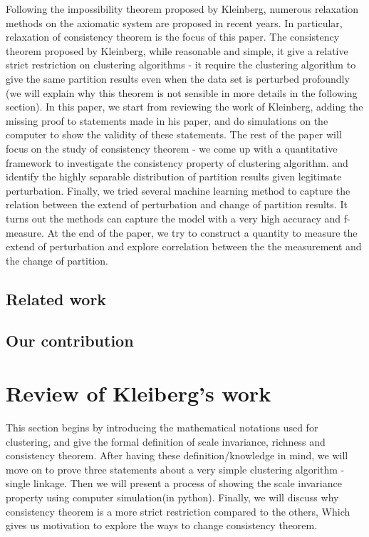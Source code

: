 \documentclass{uonmathreport}
\begin{document}
Following the impossibility theorem proposed by Kleinberg, numerous relaxation methods on the axiomatic system are proposed in recent years. In particular, relaxation of consistency theorem is the focus of this paper. The consistency theorem proposed by Kleinberg, while reasonable and simple, it give a relative strict restriction on clustering algorithms - it require the clustering algorithm to give the same partition results even when the data set is perturbed profoundly (we will explain why this theorem is not sensible in more details in the following section). In this paper, we start from reviewing the work of Kleinberg, adding the missing proof to statements made in his paper, and do simulations on the computer to show the validity of these statements. The rest of the paper will focus on the study of consistency theorem - we come up with a quantitative framework to investigate the consistency property of clustering algorithm. and identify the highly separable distribution of partition results given legitimate perturbation. Finally, we tried several machine learning method to capture the relation between the extend of perturbation and change of partition results. It turns out the methods can capture the model with a very high accuracy and f-measure. At the end of the paper, we try to construct a quantity to measure the extend of perturbation and explore correlation between the the measurement and the change of partition.
\subsection{Related work} \label{subsec:Related Work}

\subsection{Our contribution} \label{subsec:Our contribution}


\section{Review of Kleiberg's work} \label{sec:background}
This section begins by introducing the mathematical notations used for clustering, and give the formal definition of scale invariance, richness and consistency theorem. After having these definition/knowledge in mind, we will move on to prove three statements about a very simple clustering algorithm - single linkage. Then we will present a process of showing the scale invariance property using computer simulation(in python). Finally, we will discuss why consistency theorem  is a more strict restriction compared to the others, Which gives us motivation to explore the ways to change consistency theorem.
\end{document}
